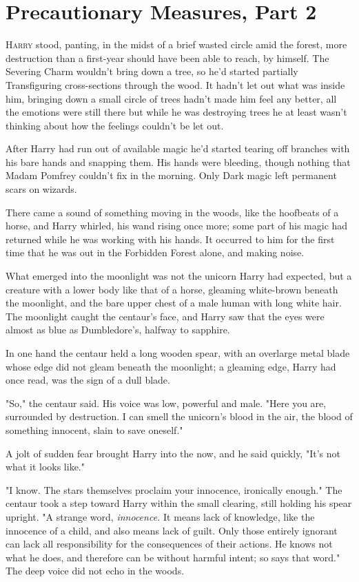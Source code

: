 \chapter{Precautionary Measures, Part 2}

\lettrine{H}{arry} stood,
panting, in the midst of a brief wasted circle amid the forest, more
destruction than a first-year should have been able to reach, by himself. The
Severing Charm wouldn't bring down a tree, so he'd started partially
Transfiguring cross-sections through the wood. It hadn't let out what was
inside him, bringing down a small circle of trees hadn't made him feel any
better, all the emotions were still there but while he was destroying trees he
at least wasn't thinking about how the feelings couldn't be let out.

After Harry had run out of available magic he'd started tearing off branches
with his bare hands and snapping them. His hands were bleeding, though nothing
that Madam Pomfrey couldn't fix in the morning. Only Dark magic left permanent
scars on wizards.

There came a sound of something moving in the woods, like the hoofbeats of a
horse, and Harry whirled, his wand rising once more; some part of his magic had
returned while he was working with his hands. It occurred to him for the first
time that he was out in the Forbidden Forest alone, and making noise.

What emerged into the moonlight was not the unicorn Harry had expected, but a
creature with a lower body like that of a horse, gleaming white-brown beneath
the moonlight, and the bare upper chest of a male human with long white hair.
The moonlight caught the centaur's face, and Harry saw that the eyes were
almost as blue as Dumbledore's, halfway to sapphire.

In one hand the centaur held a long wooden spear, with an overlarge metal blade
whose edge did not gleam beneath the moonlight; a gleaming edge, Harry had once
read, was the sign of a dull blade.

"So," the centaur said. His voice was low, powerful and male. "Here you are,
surrounded by destruction. I can smell the unicorn's blood in the air, the
blood of something innocent, slain to save oneself."

A jolt of sudden fear brought Harry into the now, and he said quickly, "It's
not what it looks like."

"I know. The stars themselves proclaim your innocence, ironically enough." The
centaur took a step toward Harry within the small clearing, still holding his
spear upright. "A strange word, \emph{innocence.} It means lack of knowledge,
like the innocence of a child, and also means lack of guilt. Only those
entirely ignorant can lack all responsibility for the consequences of their
actions. He knows not what he does, and therefore can be without harmful
intent; so says that word." The deep voice did not echo in the woods.

